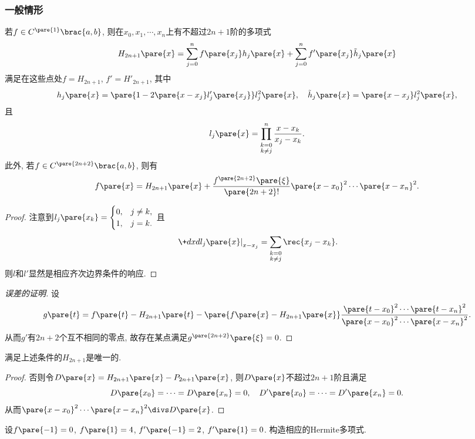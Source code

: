 \documentclass[hidelinks]{ctexart}
\begin{document}

\subsubsection{一般情形} %
\label{ssub:一般情形}

\begin{theorem}
    若$f\in C^{\pare{1}}\brac{a,b}$, 则在$x_0,x_1,\cdots,x_n$上有不超过$2n+1$阶的多项式
    \[ H_{2n+1}\pare{x} = \sum_{j=0}^n f\pare{x_j}h_j\pare{x} + \sum_{j=0}^n f'\pare{x_j}\tilde{h}_j\pare{x} \]
    满足在这些点处$f=H_{2n+1}$, $f'=H'_{2n+1}$, 其中
    \[ h_j\pare{x} = \pare{1-2\pare{x-x_j}l'_j\pare{x_j}}l_j^2\pare{x},\quad \tilde{h}_j\pare{x} = \pare{x-x_j}l_j^2\pare{x}, \]
    且
    \[ l_j\pare{x} = \prod_{\stackrel{\scriptstyle k=0}{k\neq j}}^n \frac{x-x_k}{x_j - x_k}. \]
    此外, 若$f\in C^{\pare{2n+2}}\brac{a,b}$, 则有
    \[ f\pare{x} = H_{2n+1}\pare{x} + \frac{f^{\pare{2n+2}}\pare{\xi}}{\pare{2n+2}!}\pare{x-x_0}^2 \cdots \pare{x-x_n}^2. \]
\end{theorem}
\begin{proof}
    注意到$\displaystyle l_j\pare{x_k} = \begin{cases}
        0, & j \neq k, \\
        1, & j = k.
    \end{cases}$ 且
    \[ \left.\+dxd{l_j\pare{x}}\right\vert_{x-x_j} = \sum_{\stackrel{\scriptstyle k=0}{k\neq j}} \rec{x_j - x_k}. \]
    则$l$和$l'$显然是相应齐次边界条件的响应.
\end{proof}
\begin{proof}[误差的证明]
    设
    \[ g\pare{t} = f\pare{t} - H_{2n+1}\pare{t} - \pare{f\pare{x} - H_{2n+1}\pare{x}}\frac{\pare{t-x_0}^2\cdots \pare{t-x_n}^2}{\pare{x-x_0}^2\cdots \pare{x-x_n}^2}. \]
    从而$g'$有$2n+2$个互不相同的零点, 故存在某点满足$g^{\pare{2n+2}}\pare{\xi} = 0$.
\end{proof}
\begin{theorem}
    满足上述条件的$H_{2n+1}$是唯一的.
\end{theorem}
\begin{proof}
    否则令$D\pare{x} = H_{2n+1}\pare{x} - P_{2n+1}\pare{x}$, 则$D\pare{x}$不超过$2n+1$阶且满足
    \[ D\pare{x_0} = \cdots = D\pare{x_n} = 0, \quad D'\pare{x_0} = \cdots = D'\pare{x_n} = 0. \]
    从而$\pare{x-x_0}^2\cdots\pare{x-x_n}^2\divs D\pare{x}$.
\end{proof}
\begin{ex}
    设$f\pare{-1} = 0$, $f\pare{1} = 4$, $f'\pare{-1} = 2$, $f'\pare{1} = 0$. 构造相应的Hermite多项式.
\end{ex}
\end{document}
